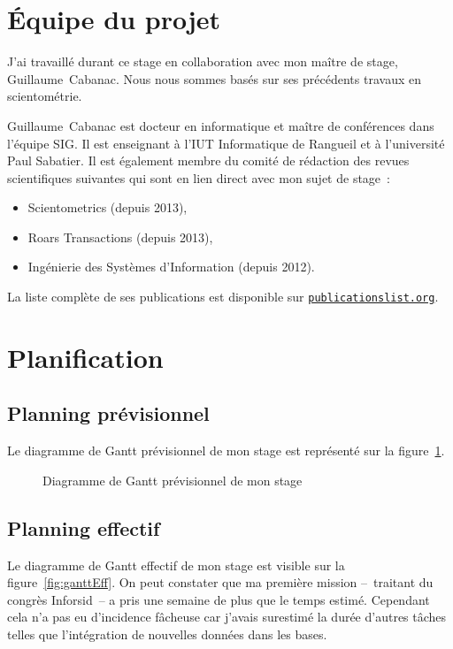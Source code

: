 \section{Équipe du projet}
	J'ai travaillé durant ce stage en collaboration avec mon maître de stage, Guillaume~Cabanac. Nous nous sommes basés sur ses précédents travaux en scientométrie.
	
	Guillaume~Cabanac est docteur en informatique et maître de conférences dans l'équipe SIG. Il est enseignant à l'IUT Informatique de Rangueil et à l'université Paul Sabatier. Il est également membre du comité de rédaction des revues scientifiques suivantes qui sont en lien direct avec mon sujet de stage~:
	\begin{itemize}
		\item Scientometrics (depuis 2013),
		\item Roars Transactions (depuis 2013),
		\item Ingénierie des Systèmes d'Information (depuis 2012).
	\end{itemize}
	
	La liste complète de ses publications est disponible sur \href{http://publicationslist.org/guillaume.cabanac}{\texttt{publicationslist.org}}.
	


\section{Planification}

	\subsection{Planning prévisionnel}
		Le diagramme de Gantt prévisionnel de mon stage est représenté sur la figure~\ref{fig:ganttPrev}.
	
		\begin{figure}[p]
			\centering
			
			\caption{Diagramme de Gantt prévisionnel de mon stage}\label{fig:ganttPrev}
		\end{figure}


	\subsection{Planning effectif}
		Le diagramme de Gantt effectif de mon stage est visible sur la figure~\ref{fig:ganttEff}. On peut constater que ma première mission --~traitant du congrès Inforsid~-- a pris une semaine de plus que le temps estimé. Cependant cela n'a pas eu d'incidence fâcheuse car j'avais surestimé la durée d'autres tâches telles que l'intégration de nouvelles données dans les bases.
		
